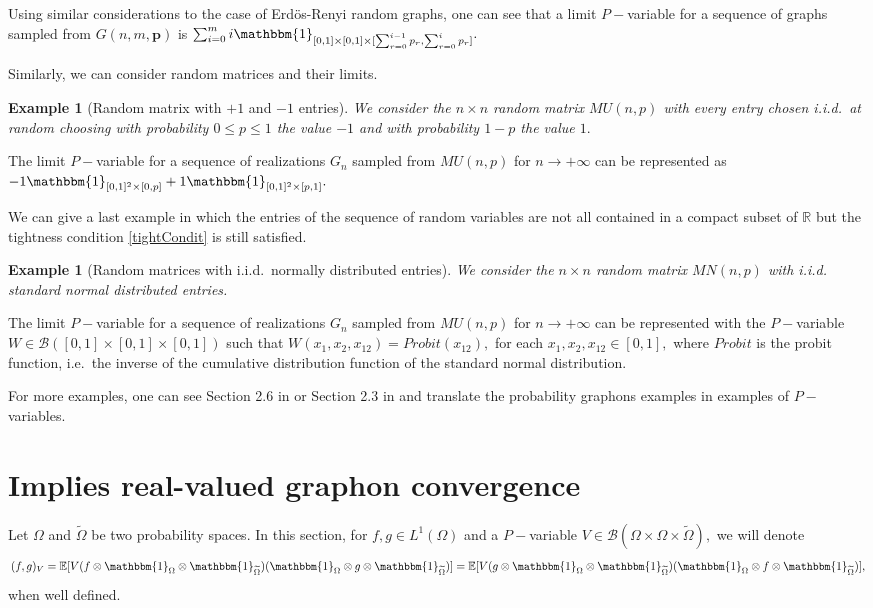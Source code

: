 \documentclass[11pt]{article}
\newtheorem{example}[theorem]{Example}
\def\R{\mathbb{R}}
\newcommand{\cB}{{\mathcal B}}  %
\begin{document}
Using similar considerations to the case of Erd\"os-Renyi random graphs, one can see that a limit $P-$variable for a sequence of  graphs sampled from $G(n,m,\mathbf{p})$ is $\sum^m_{i=0}i\mathbbm{1}_{[0,1]\times [0,1]\times [\sum^{i-1}_{r=0}p_r,\sum^{i}_{r=0}p_r]}.$


Similarly, we can consider  random matrices and their limits. 

\begin{example}[Random matrix with $+1$ and $-1$ entries]
We consider the $n\times n$ random matrix $MU(n,p)$ with every entry chosen i.i.d.\ at random choosing with probability $0\leq p\leq1$ the value  $-1$ and with probability $1-p$ the value $1.$ 
\end{example}

The limit $P-$variable for a sequence of realizations $G_n$ sampled from $MU(n,p)$ for $n\rightarrow+\infty$ can be represented as $-1\mathbbm{1}_{[0,1]^2\times [0,p]}+1\mathbbm{1}_{[0,1]^2\times [p,1]}.$


We can give a last example in which the entries of the sequence of random variables are not all contained in a compact subset of $\R$ but the tightness condition \eqref{tightCondit} is still satisfied.
\begin{example}[Random matrices with i.i.d.\ normally distributed entries]
We consider the $n\times n$ random matrix $MN(n,p)$ with i.i.d. standard normal distributed entries.  
\end{example}

The limit $P-$variable for a sequence of realizations $G_n$ sampled from $MU(n,p)$ for $n\rightarrow+\infty$ can be represented with the $P-$variable $W\in \cB([0,1]\times[0,1]\times [0,1])$ such that $W(x_1,x_2,x_{12})=Probit(x_{12}),$ for each $x_1,x_2,x_{12}\in [0,1],$ where $Probit$ is the probit function, i.e.\ the inverse of the cumulative distribution function of the standard normal distribution. 

For more examples, one can see Section 2.6 in \cite{lovász2010limits} or Section 2.3 in\cite{KUNSZENTIKOVACS2022109284} and translate the probability graphons examples in examples of $P-$variables.


\section{Implies real-valued graphon convergence}\label{Sec6ImpliesRealValuedGraphons}

Let $\Omega$ and $\widetilde \Omega$ be two probability spaces. In this section, for $f,g\in L^{1}(\Omega)$ and a $P-$variable $V\in \cB(\Omega\times \Omega\times \widetilde{\Omega}),$ we will denote
$$
(f,g)_{V}=\mathbb{E}[V(f\otimes \mathbbm{1}_{\Omega}\otimes \mathbbm{1}_{\widetilde{\Omega}}) (\mathbbm{1}_{\Omega}\otimes g \otimes \mathbbm{1}_{\widetilde{\Omega}})]=\mathbb{E}[V (g\otimes \mathbbm{1}_{\Omega}\otimes \mathbbm{1}_{\widetilde{\Omega}}) (\mathbbm{1}_{\Omega}\otimes f \otimes \mathbbm{1}_{\widetilde{\Omega}})],
$$
when well defined.
\end{document}
